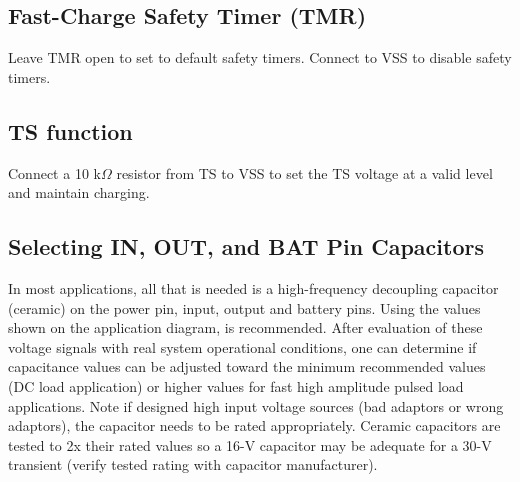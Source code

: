 \documentclass{article}
\begin{document}
\subsection{Fast-Charge Safety Timer (TMR)}
Leave TMR open to set to default safety timers. Connect to VSS to disable safety timers.

\subsection{TS function}
Connect a 10 k$\Omega$ resistor from TS to VSS to set the TS voltage at a valid level and maintain charging.

\subsection{Selecting IN, OUT, and BAT Pin Capacitors}
In most applications, all that is needed is a high-frequency decoupling capacitor (ceramic) on the power pin, input, output and battery pins. Using the values shown on the application diagram, is recommended. After evaluation of these voltage signals with real system operational conditions, one can determine if capacitance values can be adjusted toward the minimum recommended values (DC load application) or higher values for fast high amplitude pulsed load applications. Note if designed high input voltage sources (bad adaptors or wrong adaptors), the capacitor needs to be rated appropriately. Ceramic capacitors are tested to 2x their rated values so a 16-V capacitor may be adequate for a 30-V transient (verify tested rating with capacitor manufacturer).
\end{document}

